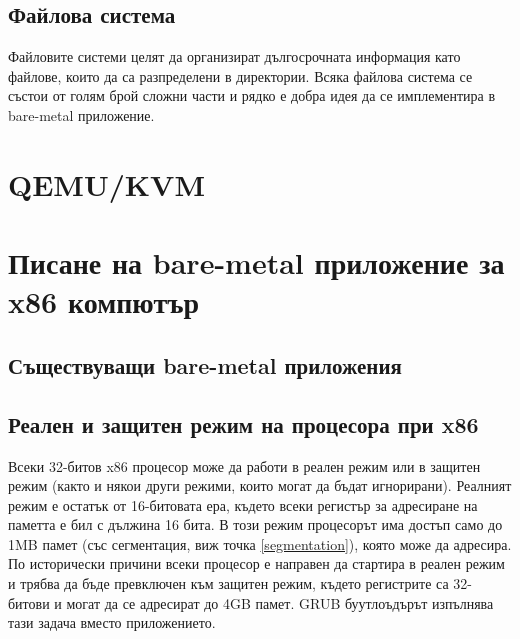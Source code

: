   \subsection{Файлова система} \label{filesystems}
  Файловите системи целят да организират дългосрочната информация като файлове, които да са разпределени в директории. Всяка файлова система се състои от голям брой сложни части и рядко е добра идея да се имплементира в bare-metal приложение.

\section{QEMU/KVM}

\section{Писане на bare-metal приложение за x86 компютър}
  \subsection{Съществуващи bare-metal приложения}

  \subsection{Реален и защитен режим на процесора при x86} \label{processormodes}
  Всеки 32-битов x86 процесор може да работи в реален режим или в защитен режим (както и някои други режими, които могат да бъдат игнорирани). Реалният режим е остатък от 16-битовата ера, където всеки регистър за адресиране на паметта е бил с дължина 16 бита. В този режим процесорът има достъп само до 1MB памет (със сегментация, виж точка \ref{segmentation}), която може да адресира. По исторически причини всеки процесор е направен да стартира в реален режим и трябва да бъде превключен към защитен режим, където регистрите са 32-битови и могат да се адресират до 4GB памет. GRUB буутлоъдърът изпълнява тази задача вместо приложението.

